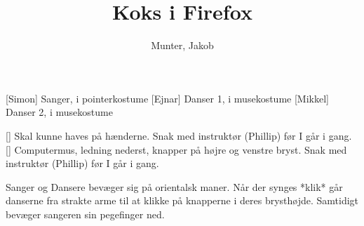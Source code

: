 \documentclass[a4paper,11pt]{article}
\title{Koks i Firefox}
\author{Munter, Jakob}
\begin{document}
\maketitle

\begin{roles}
	[Simon] Sanger, i pointerkostume
	[Ejnar] Danser 1, i musekostume
	[Mikkel] Danser 2, i musekostume
\end{roles}

\begin{props}
	 Skal kunne haves på hænderne. Snak med instruktør (Phillip) før I går i gang.
	 Computermus, ledning nederst, knapper på højre og venstre bryst. Snak med instruktør (Phillip) før I går i gang.
\end{props}

\scene Sanger og Dansere bevæger sig på orientalsk maner. Når der synges *klik* går danserne fra strakte arme til at klikke på knapperne i deres brysthøjde. Samtidigt bevæger sangeren sin pegefinger ned.
\end{document}
